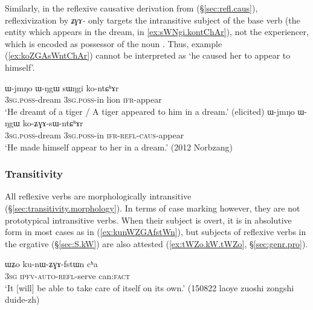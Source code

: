  Similarly, in the reflexive causative derivation  from  (§\ref{sec:refl.caus}), reflexivization by \textit{ʑɣɤ-} only targets the intransitive subject of the base verb (the entity which appears in the dream,  in \ref{ex:sWNgi.kontChAr}), not the experiencer, which is encoded as possessor of the noun . Thus, example (\ref{ex:koZGAsWntChAr}) cannot be interpreted as `he caused her to appear to himself'.
 
\begin{exe}
\ex 
\begin{xlist}
\ex \label{ex:sWNgi.kontChAr}
\gll ɯ-jmŋo ɯ-ŋgɯ sɯŋgi ko-ntɕʰɤr \\
\textsc{3sg}.\textsc{poss}-dream \textsc{3sg}.\textsc{poss}-in lion \textsc{ifr}-appear \\
\glt `He dreamt of a tiger / A tiger appeared to him in a dream.' (elicited)
\ex \label{ex:koZGAsWntChAr}
\gll  ɯ-jmŋo ɯ-ŋgɯ ko-ʑɣɤ-sɯ-ntɕʰɤr    \\
\textsc{3sg}.\textsc{poss}-dream \textsc{3sg}.\textsc{poss}-in \textsc{ifr}-\textsc{refl}-\textsc{caus}-appear  \\
\glt `He made himself appear to her in a dream.' (2012 Norbzang) 
\end{xlist}
 \end{exe}
 
  \subsubsection{Transitivity} \label{sec:refl.erg}
All reflexive verbs are morphologically intransitive (§\ref{sec:transitivity.morphology}). In terms of case marking however, they are not prototypical intransitive verbs. When their subject is overt, it is in absolutive form in most cases as in (\ref{ex:kunWZGAfstWn}), but subjects of reflexive verbs in the ergative (§\ref{sec:S.kW}) are also attested (\ref{ex:tWZo.kW.tWZo}, §\ref{sec:genr.pro}).

\begin{exe}
\ex \label{ex:kunWZGAfstWn}
 \gll ɯʑo ku-nɯ-ʑɣɤ-fstɯn cʰa \\
 \textsc{3sg} \textsc{ipfv}-\textsc{auto}-\textsc{refl}-serve can:\textsc{fact} \\
 \glt `It [will] be able to take care of itself on its own.' (150822 laoye zuoshi zongshi duide-zh) 
 \end{exe}

